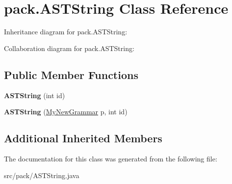 \hypertarget{classpack_1_1_a_s_t_string}{}\section{pack.\+A\+S\+T\+String Class Reference}
\label{classpack_1_1_a_s_t_string}


Inheritance diagram for pack.\+A\+S\+T\+String\+:


Collaboration diagram for pack.\+A\+S\+T\+String\+:
\subsection*{Public Member Functions}
\begin{DoxyCompactItemize}
\item 
{\bfseries A\+S\+T\+String} (int id)\hypertarget{classpack_1_1_a_s_t_string_a73f7a90581f2fe7b43ff1117bdd38921}{}\label{classpack_1_1_a_s_t_string_a73f7a90581f2fe7b43ff1117bdd38921}

\item 
{\bfseries A\+S\+T\+String} (\hyperlink{classpack_1_1_my_new_grammar}{My\+New\+Grammar} p, int id)\hypertarget{classpack_1_1_a_s_t_string_ae55e6a60921c97713580cc2c684b9997}{}\label{classpack_1_1_a_s_t_string_ae55e6a60921c97713580cc2c684b9997}

\end{DoxyCompactItemize}
\subsection*{Additional Inherited Members}


The documentation for this class was generated from the following file\+:\begin{DoxyCompactItemize}
\item 
src/pack/A\+S\+T\+String.\+java\end{DoxyCompactItemize}
